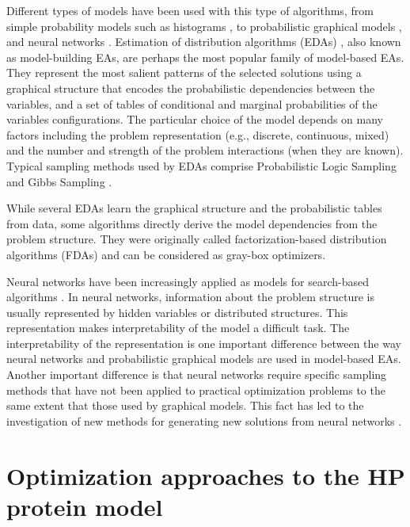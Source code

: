  
 Different types  of models have been used with this type of algorithms, from simple probability models such as histograms \cite{Tsutsui_et_al:2001}, to probabilistic graphical models \cite{Larranaga_et_al:2012}, and  neural networks \cite{Marti_et_al:2008}. Estimation of distribution algorithms (EDAs)  \cite{Muhlenbein_and_Paas:1996r,Larranaga_et_al:2012}, also known as model-building EAs,  are perhaps the most popular family of model-based EAs. They represent the most salient patterns of the selected solutions using a graphical structure that encodes the probabilistic dependencies between the variables, and a set of tables of conditional and marginal probabilities of the variables configurations. The particular choice of the model depends on many factors including the problem representation (e.g., discrete, continuous, mixed) and the number and strength of the problem interactions (when they are known). Typical sampling methods used by EDAs comprise Probabilistic Logic Sampling and Gibbs Sampling \cite{Shakya_and_Santana:2012}.

 While several EDAs learn the graphical structure and the probabilistic tables from data, some algorithms directly derive the model dependencies from  the problem structure. They were originally called factorization-based distribution algorithms (FDAs) \cite{Muhlenbein_et_al:1999} and can be considered as gray-box optimizers. 

 Neural networks have been increasingly applied as models for search-based algorithms \cite{Baluja:2017,Probst_and_Rothlauf:2015}.  In neural networks, information about the problem structure is usually represented by hidden variables or distributed structures. This representation makes interpretability of the model a difficult task. The interpretability of the representation is one important  difference between the way neural networks and probabilistic  graphical models are used in model-based EAs. Another important difference is that neural networks require specific sampling methods that have not been applied to practical optimization problems to the same extent that those used by graphical models. This fact has led to the investigation of new methods for generating new solutions from neural networks \cite{Garciarena_et_al:2020b,Garciarena_et_al:2022}.



\section{Optimization approaches to the HP protein model} \label{sec:HPMODEL}

